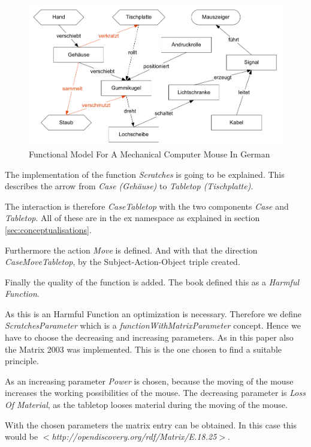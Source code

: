 \documentclass[11pt,a4paper]{article}
\begin{document}
\begin{figure}[ht]
  \centering
  \includegraphics[scale=.6]{mouse.png}
  \caption{Functional Model For A Mechanical Computer Mouse In German}
  \label{fig:functional_model_mechanical_computer_mouse}
\end{figure}

The implementation of the function \emph{Scratches} is going to be explained.
This describes the arrow from \emph{Case (Gehäuse)} to \emph{Tabletop
  (Tischplatte)}.

The interaction is therefore \emph{CaseTabletop} with the two components
\emph{Case} and \emph{Tabletop}.  All of these are in the ex namespace as
explained in section \ref{sec:conceptualisations}.

Furthermore the action \emph{Move} is defined.  And with that the direction
\emph{CaseMoveTabletop}, by the Subject-Action-Object triple created.

Finally the quality of the function is added.  The book defined this as a
\emph{Harmful Function}.

As this is an Harmful Function an optimization is necessary.  Therefore we
define \emph{ScratchesParameter} which is a \emph{functionWithMatrixParameter}
concept.  Hence we have to choose the decreasing and increasing parameters.
As in this paper also the Matrix 2003 was implemented.  This is the one chosen
to find a suitable principle.

As an increasing parameter \emph{Power} is chosen, because the moving of the
mouse increases the working possibilities of the mouse.  The decreasing
parameter is \emph{Loss Of Material}, as the tabletop looses material during
the moving of the mouse.

With the chosen parameters the matrix entry can be obtained.  In this case
this would be \emph{$<$http://opendiscovery.org/rdf/Matrix/E.18.25$>$}.
\end{document}

